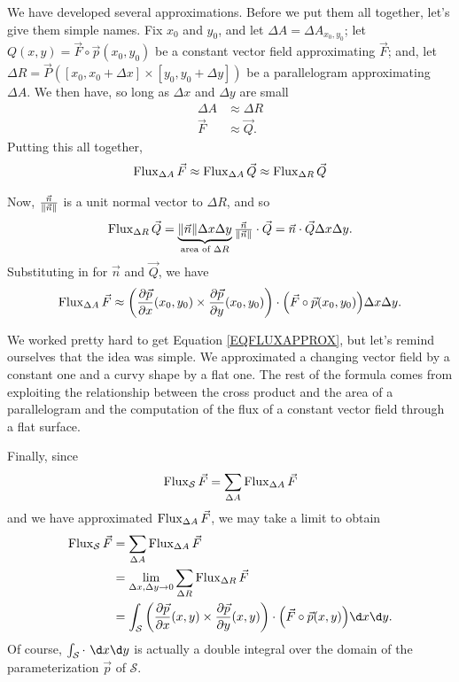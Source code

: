 We have developed several approximations.  Before we put them all together, let's
give them simple names.  Fix $x_0$ and $y_0$,
and let $\Delta A=\Delta A_{x_0,y_0}$;
let $Q(x,y) = \vec F\circ \vec p(x_0,y_0)$ be a constant
vector field approximating $\vec F$; and, let 
$\Delta R=\vec P([x_0,x_0+\Delta x]\times [y_0,y_0+\Delta y])$ be a parallelogram
approximating $\Delta A$.  We then have, so long as $\Delta x$ and $\Delta y$ are small
\begin{align*}
	\Delta A &\approx \Delta R\\
	\vec F &\approx \vec Q.
\end{align*}
Putting this all together, 
\begin{align*}
	\operatorname{Flux}_{\Delta A}\vec F
	\approx \operatorname{Flux}_{\Delta A}\vec Q 
	\approx \operatorname{Flux}_{\Delta R}\vec Q
\end{align*}

Now, $\tfrac{\vec n}{\lVert\vec n\rVert}$ is a unit normal vector to $\Delta R$,
and so
\[
	\operatorname{Flux}_{\Delta R}\vec Q = 
	\underbrace{\lVert\vec n\rVert\Delta x\Delta y}_{\text{area of $\Delta R$}}\tfrac{\vec n}{\lVert\vec n\rVert}\cdot \vec Q
	=\vec n\cdot \vec Q\Delta x\Delta y.
\]
Substituting in for $\vec n$ and $\vec Q$, we have
\begin{equation}
	\label{EQFLUXAPPROX}
	\operatorname{Flux}_{\Delta A}\vec F
	\approx 
	\left(\frac{\partial \vec p}{\partial x}(x_0,y_0) \times
	\frac{\partial \vec p}{\partial y}(x_0,y_0)\right)
	\cdot \Big(\vec F\circ \vec p(x_0,y_0)\Big )\Delta x \Delta y.
\end{equation}

We worked pretty hard to get Equation \eqref{EQFLUXAPPROX}, but
let's remind ourselves that the idea was simple.  We approximated
a changing vector field by a constant one and a curvy shape by a flat one.
The rest of the formula comes from exploiting the relationship between
the cross product and the area of a parallelogram and the computation
of the flux of a constant vector field through a flat surface.

Finally, since 
\[
	\operatorname{Flux}_{\mathcal S} \vec F = \sum_{\Delta A} \operatorname{Flux}_{\Delta A} \vec F
\]
and we have approximated $\operatorname{Flux}_{\Delta A}\vec F$, we may take a limit to obtain
\begin{align*}
	\Flux_{\mathcal S} \vec F &= \sum_{\Delta A} \Flux_{\Delta A} \vec F\\
	&=\lim_{\Delta x,\Delta y\to 0} \sum_{\Delta R} \Flux_{\Delta R} \vec F\\
	&= \int_{\mathcal S} 
	\left(\frac{\partial \vec p}{\partial x}(x,y) \times
	\frac{\partial \vec p}{\partial y}(x,y)\right)
	\cdot \Big(\vec F\circ \vec p(x,y)\Big )\d x\d y.
\end{align*}
Of course, $\int_{\mathcal S}\cdot\ \d x\d y$ is actually a double integral
over the domain of the parameterization $\vec p$ of $\mathcal S$.

